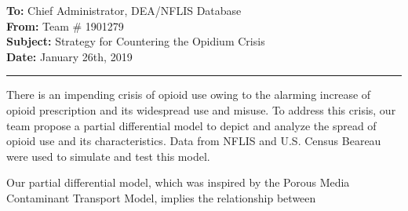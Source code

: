 \textbf{To: }Chief Administrator, DEA/NFLIS Database \\
\textbf{From: }Team \# 1901279 \\
\textbf{Subject: }Strategy for Countering the Opidium Crisis \\
\textbf{Date: }January 26th, 2019\\
\rule{\textwidth}{0.1mm}
There is an impending crisis of opioid use owing to the alarming increase of opioid prescription and its widespread use and misuse. To address this crisis, our team propose a partial differential model to depict and analyze the spread of opioid use and its characteristics. Data from NFLIS and U.S. Census Beareau were used to simulate and test this model.

Our partial differential model, which was inspired by the Porous Media Contaminant Transport Model, implies the relationship between 